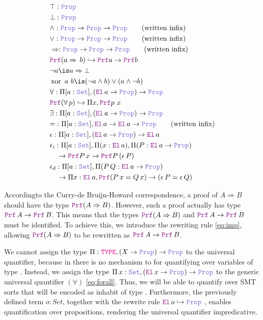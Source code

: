 \begin{definition}
\begin{align}
& \top : \prop \\
& \bot : \prop \\
& \land : \prop \ra \prop \ra \prop \qquad \text{(written inﬁx)} \\
& \lor : \prop \ra \prop \ra \prop \qquad \text{(written inﬁx)} \\
& \Rightarrow : \prop \ra \prop \ra \prop \qquad \text{(written inﬁx)} \\
&  \prf (a \Rightarrow\,b) \re \prf a \ra \prf b \label{eq:imp}\\
& \neg a \is a \Rightarrow \bot \\
& \mathop{\mathrm{xor}}~a~b \is (\neg a \land b) \lor (a \land \neg b) \\
& \forall : \Pi {[a: \set]}, (\el\, a \ra \prop) \ra \prop \label{eq:forall}\\
& \prf{}(\forall\,p) \re \Pi x, \prf{p~x}\\
& \exists : \Pi {[a: \set]}, (\el\, a \ra \prop) \ra \prop \\
& {=} : \Pi [a : \set], \el\, a \ra \el\, a \ra \prop \qquad \text{(written inﬁx)} \\
& \epsilon: \Pi {[a: \set]}, (\el\,a \ra \prop) \ra \el\,a \\
& \epsilon_i: \Pi {[a: \set]}, \Pi (x : \el\,a), \Pi (P : \el\,a \ra \prop) \\
& \quad \ra \prf P\,x \ra \prf P\,(\epsilon\,P) \\
& \epsilon_{d}: \Pi {[a: \set]}, \Pi (P\,Q : \el\,a \ra \prop) \\
& \quad \ra \Pi x : \el\,a, \prf (P\,x = Q\,x) \ra (\epsilon \, P = \epsilon \, Q)
\end{align}
\end{definition}

Accordingto the Curry-de Bruijn-Howard correspondence, a proof of $A \Rightarrow B$ should have the type $\prf (A \Rightarrow B)$.
However, such a proof actually has type $\prf\,A \ra \prf\,B$. This means that the types $\prf (A \Rightarrow B)$ and $\prf\,A \ra \prf\,B$ must be identiﬁed.
To achieve this, we introduce the rewriting rule \cref{eq:imp}, allowing $\prf (A \Rightarrow B)$ to be rewritten as $\prf\,A \ra \prf\,B$.

We cannot assign the type $\Pi : \type, (X \ra \prop) \ra \prop$ to the universal quantifier, because in \lpm{} there is no mechanism to
for quantifying over variables of type \type. Instead, we assign the type $\Pi\,x:\set{},(\el\,x \ra \prop) \ra \prop$ to the generic universal quantiﬁer $(\forall)$ \cref{eq:forall}.
Thus, we will be able to quantify over SMT sorts that will be encoded as inhabit of type \set. Furthermore, the previously defined term $o: Set$, together with the rewrite rule $\el\,o\index{o}  \hookrightarrow \prop$
, enables quantification over propositions, rendering the universal quantifier impredicative.

